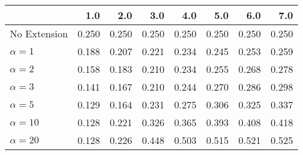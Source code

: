 \begin{tabular}{lrrrrrrr}
\toprule
{} &   1.0 &   2.0 &   3.0 &   4.0 &   5.0 &   6.0 &   7.0 \\
\midrule
No Extension  & 0.250 & 0.250 & 0.250 & 0.250 & 0.250 & 0.250 & 0.250 \\
$\alpha = 1$  & 0.188 & 0.207 & 0.221 & 0.234 & 0.245 & 0.253 & 0.259 \\
$\alpha = 2$  & 0.158 & 0.183 & 0.210 & 0.234 & 0.255 & 0.268 & 0.278 \\
$\alpha = 3$  & 0.141 & 0.167 & 0.210 & 0.244 & 0.270 & 0.286 & 0.298 \\
$\alpha = 5$  & 0.129 & 0.164 & 0.231 & 0.275 & 0.306 & 0.325 & 0.337 \\
$\alpha = 10$ & 0.128 & 0.221 & 0.326 & 0.365 & 0.393 & 0.408 & 0.418 \\
$\alpha = 20$ & 0.128 & 0.226 & 0.448 & 0.503 & 0.515 & 0.521 & 0.525 \\
\bottomrule
\end{tabular}
